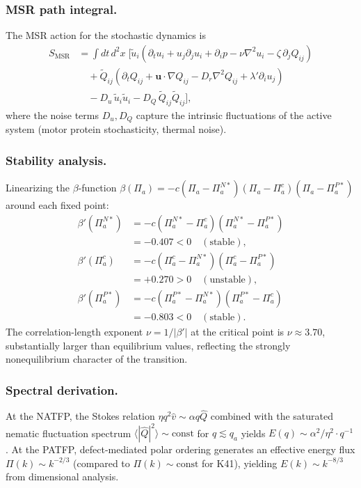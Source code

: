 \subsubsection*{MSR path integral.}
The MSR action for the stochastic dynamics is
\begin{equation}
\begin{split}
S_{\mathrm{MSR}} &= \int\!dt\,d^2x\;\bigl[\tilde{u}_i(\partial_t u_i + u_j\partial_j u_i + \partial_i p - \nu\nabla^2 u_i - \zeta\,\partial_j Q_{ij}) \\
&\quad + \tilde{Q}_{ij}(\partial_t Q_{ij} + \mathbf{u}\cdot\nabla Q_{ij} - D_r\nabla^2 Q_{ij} + \lambda'\partial_i u_j) \\
&\quad - D_u\,\tilde{u}_i\tilde{u}_i - D_Q\,\tilde{Q}_{ij}\tilde{Q}_{ij}\bigr],
\end{split}
\end{equation}
where the noise terms $D_u, D_Q$ capture the intrinsic fluctuations of the active system (motor protein stochasticity, thermal noise).

\subsubsection*{Stability analysis.}
Linearizing the $\beta$-function $\beta(\Pi_a)=-c(\Pi_a-\Pi_a^{N*})(\Pi_a-\Pi_a^c)(\Pi_a-\Pi_a^{P*})$ around each fixed point:
\begin{align}
\beta'(\Pi_a^{N*}) &= -c(\Pi_a^{N*}-\Pi_a^c)(\Pi_a^{N*}-\Pi_a^{P*}) \\
&= -0.407 < 0 \quad (\text{stable}), \\
\beta'(\Pi_a^c) &= -c(\Pi_a^c-\Pi_a^{N*})(\Pi_a^c-\Pi_a^{P*}) \\
&= +0.270 > 0 \quad (\text{unstable}), \\
\beta'(\Pi_a^{P*}) &= -c(\Pi_a^{P*}-\Pi_a^{N*})(\Pi_a^{P*}-\Pi_a^c) \\
&= -0.803 < 0 \quad (\text{stable}).
\end{align}
The correlation-length exponent $\nu=1/|\beta'|$ at the critical point is $\nu\approx 3.70$, substantially larger than equilibrium values, reflecting the strongly nonequilibrium character of the transition.

\subsubsection*{Spectral derivation.}
At the NATFP, the Stokes relation $\eta q^2\hat{v}\sim\alpha q\hat{Q}$ combined with the saturated nematic fluctuation spectrum $\langle|\hat{Q}|^2\rangle\sim\text{const}$ for $q\lesssim q_a$ yields $E(q)\sim\alpha^2/\eta^2\cdot q^{-1}$. At the PATFP, defect-mediated polar ordering generates an effective energy flux $\Pi(k)\sim k^{-2/3}$ (compared to $\Pi(k)\sim\text{const}$ for K41), yielding $E(k)\sim k^{-8/3}$ from dimensional analysis.

